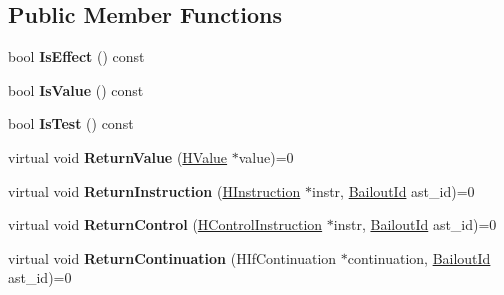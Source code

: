 \subsection*{Public Member Functions}
\begin{DoxyCompactItemize}
\item 
\hypertarget{classv8_1_1internal_1_1_ast_context_a9ef7dcdc0fc4878eac2fba9ec899cf74}{}bool {\bfseries Is\+Effect} () const \label{classv8_1_1internal_1_1_ast_context_a9ef7dcdc0fc4878eac2fba9ec899cf74}

\item 
\hypertarget{classv8_1_1internal_1_1_ast_context_abab34ae1d1f4f30554e402981a9c8b41}{}bool {\bfseries Is\+Value} () const \label{classv8_1_1internal_1_1_ast_context_abab34ae1d1f4f30554e402981a9c8b41}

\item 
\hypertarget{classv8_1_1internal_1_1_ast_context_a745e8856780d7325898ee9ae28036876}{}bool {\bfseries Is\+Test} () const \label{classv8_1_1internal_1_1_ast_context_a745e8856780d7325898ee9ae28036876}

\item 
\hypertarget{classv8_1_1internal_1_1_ast_context_a02a778cd8697728b1d65c7784e81a708}{}virtual void {\bfseries Return\+Value} (\hyperlink{classv8_1_1internal_1_1_h_value}{H\+Value} $\ast$value)=0\label{classv8_1_1internal_1_1_ast_context_a02a778cd8697728b1d65c7784e81a708}

\item 
\hypertarget{classv8_1_1internal_1_1_ast_context_ac382417ecde5e65dd502ba717dfeb573}{}virtual void {\bfseries Return\+Instruction} (\hyperlink{classv8_1_1internal_1_1_h_instruction}{H\+Instruction} $\ast$instr, \hyperlink{classv8_1_1internal_1_1_bailout_id}{Bailout\+Id} ast\+\_\+id)=0\label{classv8_1_1internal_1_1_ast_context_ac382417ecde5e65dd502ba717dfeb573}

\item 
\hypertarget{classv8_1_1internal_1_1_ast_context_a0d14d70c6f23b3ed5a0b093546da90f7}{}virtual void {\bfseries Return\+Control} (\hyperlink{classv8_1_1internal_1_1_h_control_instruction}{H\+Control\+Instruction} $\ast$instr, \hyperlink{classv8_1_1internal_1_1_bailout_id}{Bailout\+Id} ast\+\_\+id)=0\label{classv8_1_1internal_1_1_ast_context_a0d14d70c6f23b3ed5a0b093546da90f7}

\item 
\hypertarget{classv8_1_1internal_1_1_ast_context_a31ce4d727e6c5c4476c385b53418aba9}{}virtual void {\bfseries Return\+Continuation} (H\+If\+Continuation $\ast$continuation, \hyperlink{classv8_1_1internal_1_1_bailout_id}{Bailout\+Id} ast\+\_\+id)=0\label{classv8_1_1internal_1_1_ast_context_a31ce4d727e6c5c4476c385b53418aba9}


\end{DoxyCompactItemize}
